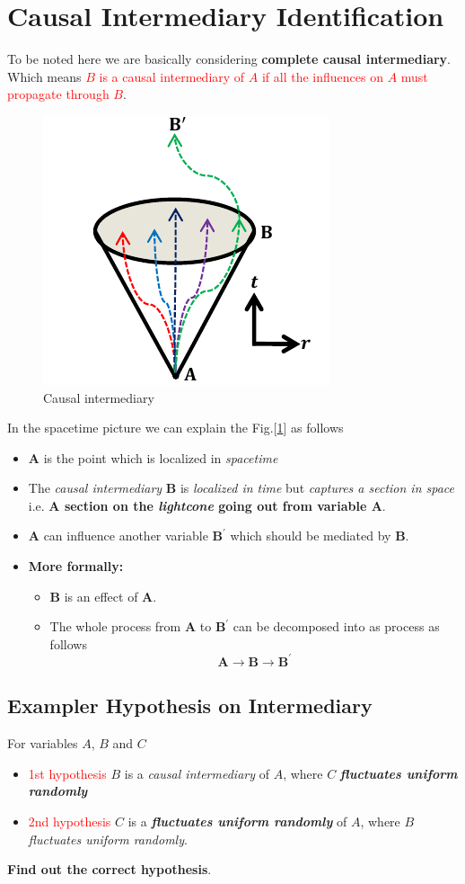 \documentclass[a4paper,11pt]{article}
\begin{document}
\section{Causal Intermediary Identification}
To be noted here we are basically considering \textbf{complete causal intermediary}. Which means \textcolor{red}{$B$ is a causal intermediary of $A$ if all the influences on $A$ must propagate through $B$}.
\begin{figure}[tbh!]
	\centering
	\includegraphics[width=0.3\linewidth]{pics/intermediary}
	\caption{Causal intermediary}
	\label{fig:causal-intermediaty}
\end{figure}
In the spacetime picture we can explain the Fig.[\ref{fig:causal-intermediaty}] as follows
\begin{itemize}
	\item $\mathbf{A}$ is the point which is localized in \textit{spacetime}
	\item The \textit{causal intermediary} $\mathbf{B}$ is \textit{localized in time} but \textit{captures a section in space} i.e. \textbf{A section on the \textit{lightcone} going out from variable $\mathbf{A}$}.
	\item $\mathbf{A}$ can influence another variable $\mathbf{B^\prime}$ which should be mediated by $\mathbf{B}$.
	\item \textbf{More formally:}
	\begin{itemize}
		\item $\mathbf{B}$ is an effect of $\mathbf{A}$.
		\item The whole process from $\mathbf{A}$ to $\mathbf{B^\prime}$ can be decomposed into as process as follows
		\begin{equation}
			\mathbf{A}\rightarrow\mathbf{B}\rightarrow\mathbf{B^\prime}
		\end{equation}
	\end{itemize}
\end{itemize}
\subsection{Exampler Hypothesis on Intermediary}
For variables $A$, $B$ and $C$
\begin{itemize}
	\item \textcolor{red}{1st hypothesis} $B$ is a \textit{causal intermediary} of $A$, where $C$ \textit{\textbf{fluctuates uniform randomly}}
	\item \textcolor{red}{2nd hypothesis} $C$ is a \textit{\textbf{fluctuates uniform randomly}} of $A$, where $B$ \textit{fluctuates uniform randomly}.
\end{itemize}
\textbf{Find out the correct hypothesis}.
\end{document}
